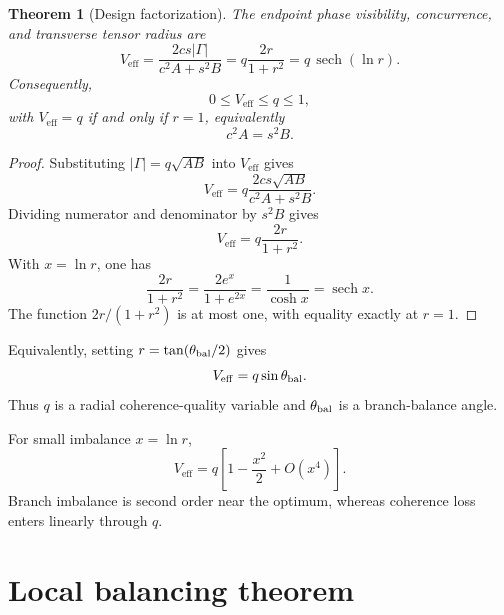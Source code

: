 \documentclass[reprint,aps,pra,superscriptaddress,nofootinbib,longbibliography]{revtex4-2}
\newtheorem{theorem}{Theorem}
\newcommand{\sech}{\operatorname{sech}}
\newcommand{\Veff}{V_{\mathrm{eff}}}
\begin{document}
\begin{theorem}[Design factorization]
The endpoint phase visibility, concurrence, and transverse tensor radius are
\begin{equation}
\Veff=\frac{2cs|\Gamma|}{c^2A+s^2B}
=q\frac{2r}{1+r^2}
=q\,\sech(\ln r).
\label{eq:design-factorization}
\end{equation}
Consequently,
\begin{equation}
0\le \Veff\le q\le1,
\label{eq:Vleq}
\end{equation}
with \(\Veff=q\) if and only if \(r=1\), equivalently
\begin{equation}
c^2A=s^2B.
\label{eq:balance-condition}
\end{equation}
\end{theorem}

\begin{proof}
Substituting \(|\Gamma|=q\sqrt{AB}\) into \(\Veff\) gives
\begin{equation}
\Veff=
q\frac{2cs\sqrt{AB}}{c^2A+s^2B}.
\end{equation}
Dividing numerator and denominator by \(s^2B\) gives
\begin{equation}
\Veff=q\frac{2r}{1+r^2}.
\end{equation}
With \(x=\ln r\), one has
\begin{equation}
\frac{2r}{1+r^2}
=\frac{2e^x}{1+e^{2x}}
=\frac{1}{\cosh x}
=\sech x.
\end{equation}
The function \(2r/(1+r^2)\) is at most one, with equality exactly at \(r=1\).
\end{proof}

Equivalently, setting \(r=\tan(\theta_{\rm bal}/2)\) gives
\begin{equation}
\Veff=q\sin\theta_{\rm bal}.
\label{eq:theta-bal}
\end{equation}
Thus \(q\) is a radial coherence-quality variable and \(\theta_{\rm bal}\) is a branch-balance angle.

For small imbalance \(x=\ln r\),
\begin{equation}
\Veff=q\left[1-\frac{x^2}{2}+O(x^4)\right].
\label{eq:small-imbalance}
\end{equation}
Branch imbalance is second order near the optimum, whereas coherence loss enters linearly through \(q\).

\section{Local balancing theorem}
\end{document}
